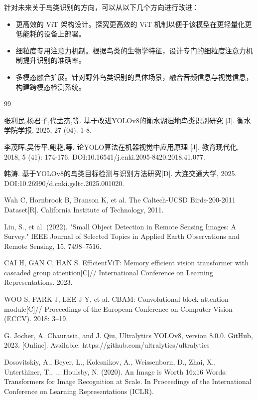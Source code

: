\documentclass[12pt]{ctexart}
\begin{document}
针对未来关于鸟类识别的方向，可以从以下几个方向进行改进：

\begin{itemize}
  \item 更高效的 ViT 架构设计。探究更高效的 ViT 机制以便于该模型在更轻量化更低能耗的设备上部署。
  \item 细粒度专用注意力机制。根据鸟类的生物学特征，设计专门的细粒度注意力机制提升识别的准确率。
  \item 多模态融合扩展。针对野外鸟类识别的具体场景，融合音频信息与视觉信息，构建跨模态检测系统。
\end{itemize}




\newpage
\begin{thebibliography}{99}  

 张利民,杨君子,代孟杰,等. 基于改进YOLOv8的衡水湖湿地鸟类识别研究 [J]. 衡水学院学报, 2025, 27 (04): 1-8.

 李茂晖,吴传平,鲍艳,等. 论YOLO算法在机器视觉中应用原理 [J]. 教育现代化, 2018, 5 (41): 174-176. DOI:10.16541/j.cnki.2095-8420.2018.41.077.

 韩涛. 基于YOLOv8的鸟类目标检测与识别方法研究[D]. 大连交通大学, 2025. DOI:10.26990/d.cnki.gsltc.2025.001020.

 Wah C, Hornbrook B, Branson K, et al. The Caltech-UCSD Birds-200-2011 Dataset[R]. California Institute of Technology, 2011.

 Liu, S., et al. (2022). "Small Object Detection in Remote Sensing Images: A Survey." IEEE Journal of Selected Topics in Applied Earth Observations and Remote Sensing, 15, 7498–7516.

 CAI H, GAN C, HAN S. EfficientViT: Memory efficient vision transformer with cascaded group attention[C]// International Conference on Learning Representations. 2023.

 WOO S, PARK J, LEE J Y, et al. CBAM: Convolutional block attention module[C]// Proceedings of the European Conference on Computer Vision (ECCV). 2018: 3–19.

 G. Jocher, A. Chaurasia, and J. Qiu, Ultralytics YOLOv8, version 8.0.0. GitHub, 2023. [Online]. Available: https://github.com/ultralytics/ultralytics 

 Dosovitskiy, A., Beyer, L., Kolesnikov, A., Weissenborn, D., Zhai, X., Unterthiner, T., ...  Houlsby, N. (2020). An Image is Worth 16x16 Words: Transformers for Image Recognition at Scale. In Proceedings of the International Conference on Learning Representations (ICLR).


\end{thebibliography}
\end{document}
